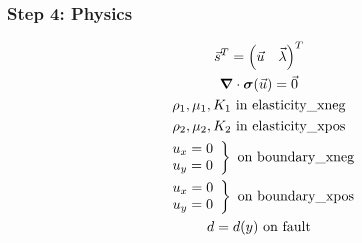 \documentclass[aspectratio=169]{beamer}
\begin{document}
\begin{frame}
  \frametitle{Step 4: Physics}
  \summary{}

  \begin{minipage}{0.35\textwidth}
    {\scriptsize
    \begin{gather*}
    \vec{s}^T = \left( \vec{u} \quad \vec{\lambda} \right)^T \\
    \bm{\nabla} \cdot \bm{\sigma}(\vec{u}) = \vec{0} \\
    \rho_1, \mu_1, K_1 \text{ in elasticity\_xneg} \\ 
    \rho_2, \mu_2, K_2 \text{ in elasticity\_xpos} \\ 
    \left. \begin{array}{c} u_x = 0 \\ u_y = 0 \end{array}\right\} \text{ on boundary\_xneg} \\
    \left. \begin{array}{c} u_x = 0 \\ u_y = 0 \end{array}\right\} \text{ on boundary\_xpos} \\
    d = d(y) \text{ on fault}
    \end{gather*}}
  \end{minipage}
  \hfill
  \begin{minipage}{0.60\textwidth}
  \end{minipage}
      
\end{frame}
\end{document}
